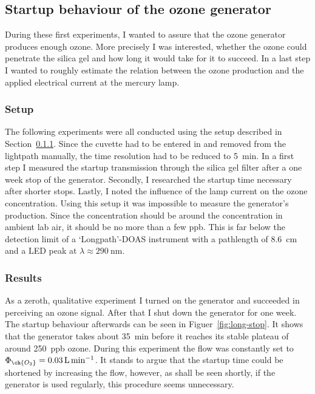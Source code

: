 \subsection{Startup behaviour of the ozone generator}
\label{sec:ozone}

During these first experiments, I wanted to assure that the ozone
generator produces enough ozone. More precisely I was interested,
whether the ozone could penetrate the silica gel and how long it would
take for it to succeed. In a last step I wanted to roughly estimate
the relation between the ozone production and the applied electrical
current at the mercury lamp.

\subsubsection{Setup}
\label{sec:ozone-setup}

The following experiments were all conducted using the setup described
in Section~\ref{sec:ozone-setup}. Since the cuvette had to be entered
in and removed from the lightpath manually, the time resolution had to
be reduced to \SI{5}{\minute}. In a first step I measured the startup
 transmission through the silica gel filter after a one week
stop of the generator. Secondly, I researched the startup time
necessary after shorter stops. Lastly, I noted the influence of the
lamp current on the ozone concentration. Using this setup it was
impossible to measure the generator's  production. Since the
concentration should be around the  concentration in ambient
lab air, it should be no more than a few \si{ppb}. This is far below
the detection limit of a `Longpath'-DOAS instrument with a pathlength
of \SI{8.6}{\centi\meter} and a LED peak at $\lambda \approx
\SI{290}{\nano\meter}$.

\subsubsection{Results}
\label{sec:ozone-results}

As a zeroth, qualitative experiment I turned on the generator
and succeeded in perceiving an ozone signal. After that I shut down the generator
for one week. The startup behaviour afterwards can be seen in
Figuer~\ref{fig:long-stop}. It shows that the generator takes about
\SI{35}{\minute} before it reaches its stable plateau of around
\SI{250}{ppb} ozone. During this experiment the flow was constantly
set to $\Phi_{\ch{O_3}} = \SI{0.03}{\liter\per\minute}$. It stands to
argue that the startup time could be shortened by increasing the flow,
however, as shall be seen shortly, if the
generator is used regularly, this procedure seems unnecessary.

